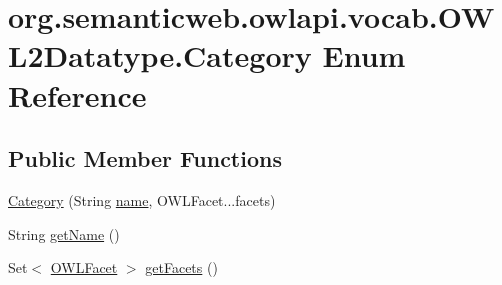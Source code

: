 \hypertarget{enumorg_1_1semanticweb_1_1owlapi_1_1vocab_1_1_o_w_l2_datatype_1_1_category}{\section{org.\-semanticweb.\-owlapi.\-vocab.\-O\-W\-L2\-Datatype.\-Category Enum Reference}
\label{enumorg_1_1semanticweb_1_1owlapi_1_1vocab_1_1_o_w_l2_datatype_1_1_category}
}
\subsection*{Public Member Functions}
\begin{DoxyCompactItemize}
\item 
\hyperlink{enumorg_1_1semanticweb_1_1owlapi_1_1vocab_1_1_o_w_l2_datatype_1_1_category_a1adb5d17769ec873a63d091a72f72acf}{Category} (String \hyperlink{enumorg_1_1semanticweb_1_1owlapi_1_1vocab_1_1_o_w_l2_datatype_1_1_category_ae213fdcd31989462299c102900ccb23e}{name}, O\-W\-L\-Facet...\-facets)
\item 
String \hyperlink{enumorg_1_1semanticweb_1_1owlapi_1_1vocab_1_1_o_w_l2_datatype_1_1_category_a409548b6737273b04b452062959f3b6b}{get\-Name} ()
\item 
Set$<$ \hyperlink{enumorg_1_1semanticweb_1_1owlapi_1_1vocab_1_1_o_w_l_facet}{O\-W\-L\-Facet} $>$ \hyperlink{enumorg_1_1semanticweb_1_1owlapi_1_1vocab_1_1_o_w_l2_datatype_1_1_category_a92a19b54f9b953a9ec0acb0ad49cfc7c}{get\-Facets} ()
\end{DoxyCompactItemize}
